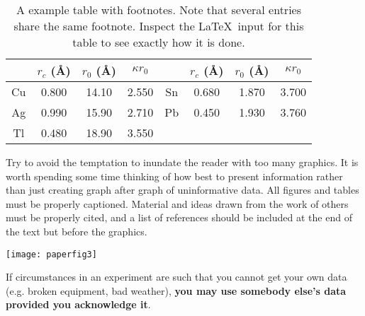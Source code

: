 \documentclass[aps,twocolumn,secnumarabic,nobalancelastpage,amsmath,amssymb,nofootinbib]{revtex4}
\begin{document}
\begin{table}[h]
\caption{\label{tab:table1}A example table with footnotes.  Note that several 
entries share the same
footnote. Inspect the \LaTeX\ input for this table to see
exactly how it is done.}
\begin{ruledtabular}
\begin{tabular}{cccccccc}
 &$r_c$ (\AA)&$r_0$ (\AA)&$\kappa r_0$&
 &$r_c$ (\AA) &$r_0$ (\AA)&$\kappa r_0$\\
\hline
Cu& 0.800 & 14.10 & 2.550 &Sn\footnotemark[1] & 0.680 & 1.870 & 3.700 \\
Ag& 0.990 & 15.90 & 2.710 &Pb\footnotemark[1] & 0.450 & 1.930 & 3.760 \\
Tl& 0.480 & 18.90 & 3.550 & & & & \\
\end{tabular}
\end{ruledtabular}
\end{table}

Try to avoid the temptation to inundate the reader with too many
graphics.  It is worth spending some time thinking of how best to
present information rather than just creating graph after graph of
uninformative data.  All figures and tables must be properly
captioned.  Material and ideas drawn from the work of others must be
properly cited, and a list of references should be included at the end
of the text but before the graphics.



\begin{figure*}[htb]
\texttt{[image: paperfig3]}
\caption{Sample paneled figure created in Matlab using the
subplot(2,2,x) command where x is the element of the plot array into
which all subsequent commands such as plot(x,y) and xlabel('Volts'),
etc. get processed.  Use the caption space to provide more details
about the data, their acquisition or how they were processed if you do
not have sufficient room in the main body of text.  Figures can be
rotated using the angle command, see the TeX file for details.  If a
figure is to be placed after the main text use the ``figure*'' option
to make it extend over two columns, see the \LaTeX file for how this
was done.}
\label{fig:panel2x2}
\end{figure*}


If circumstances in an experiment are such that you cannot get your
own data (e.g. broken equipment, bad weather), {\bf you may use
somebody else's data provided you acknowledge it}.
\end{document}
